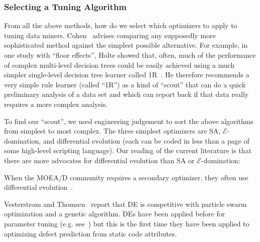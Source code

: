  
 
 \subsubsection{Selecting a Tuning Algorithm}
 
From all the above methods, how do we select which optimizers to apply to tuning data miners.
Cohen~\cite{cohen95} advises comparing any supposedly more
sophisticated method against the simplest possible alternative. For
example, in one study with ``floor effects'', Holte showed that,
often, much of the performance of complex multi-level decision trees
could be easily achieved using a much simpler single-level decision
tree learner called 1R~\cite{holte93}. He therefore recommends a very simple rule learner
(called ``1R'') as a
kind of ``scout'' that can do a quick preliminary analysis of a data
set and which can report back if that data really requires a more
complex analysis.

To find our ``scout'',  we used engineering judgement to sort  the above algorithms from simplest to most complex.
The three simplest optimizers are SA, $\mathcal{E}$-domination, and 
differential evolution (each can be coded in less than a page of some high-level scripting language). Our reading of the current literature is that there are more  advocates for
differential evolution than
  SA or $\mathcal{E}$-domination:
  \bi
  \item
  When the MOEA/D community requires a secondary optimizer, they often use  differential evolution~\cite{zhang07,5583335}.
  \item
 Vesterstrom and Thomsen~\cite{Vesterstrom04} report that DE is competitive with 
   particle swarm optimization and a genetic algorithm. 
   \ei
DEs have been applied before for   parameter tuning (e.g. see~\cite{omran2005differential, chiha2012tuning}) but this is the first time they have been applied to
optimizing defect prediction from static code attributes.  


 
 


 
 